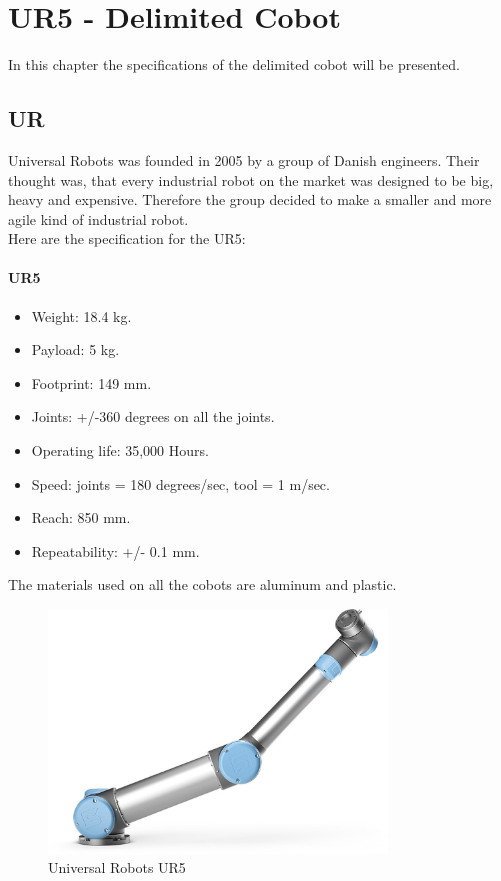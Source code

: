 \chapter{UR5 - Delimited Cobot}

In this chapter the specifications of the delimited cobot will be presented.

\section{UR}

Universal Robots was founded in 2005 by a group of Danish engineers. Their thought was, that every industrial robot on the market was designed to be big, heavy and expensive. Therefore the group decided to make a smaller and more agile kind of industrial robot.\cite{Urhist}\\
Here are the specification for the UR5:\\ 

\subsubsection{UR5}

\begin{itemize}
    \item Weight: 18.4 kg.
    \item Payload: 5 kg.
    \item Footprint: 149 mm.
    \item Joints: +/-360 degrees on all the joints.
    \item Operating life: 35,000 Hours.
    \item Speed: joints = 180 degrees/sec, tool = 1 m/sec.
    \item Reach: 850 mm.
    \item Repeatability: +/- 0.1 mm.
\end{itemize}

The materials used on all the cobots are aluminum and plastic\cite{Ur5_about}\cite{UR5_tech}.\\

\begin{figure}
    \centering
    \includegraphics[width=9cm]{UR/UR5pic.jpg}
    \caption{Universal Robots UR5 \cite{UR5billede}}
    \label{fig:UR5}
\end{figure}